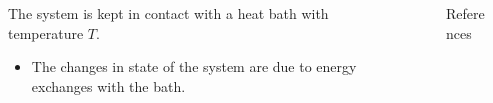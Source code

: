 \documentclass[final]{beamer}
\newlength{\sepwidth}
\newlength{\colwidth}
\newcommand{\separatorcolumn}{\begin{column}{\sepwidth}\end{column}}
\begin{document}
\begin{frame}[t]
\begin{columns}[t]
\begin{column}{\colwidth}
The system is kept in contact with a heat bath with temperature $T$.
\begin{itemize}
\item The changes in state of the system are due to energy exchanges with the bath.
\end{itemize}




\end{column}

\separatorcolumn

\begin{column}{\colwidth}
 \end{column}

\separatorcolumn

\begin{column}{\colwidth}
  \begin{block}{References}

    \nocite{*}
    \footnotesize{}
    
  \end{block}

\end{column}

\separatorcolumn
\end{columns}
\end{frame}
\end{document}

